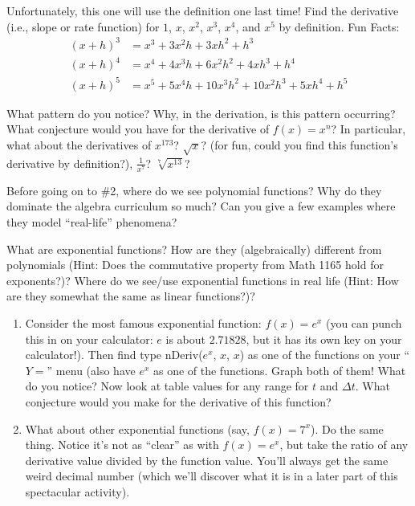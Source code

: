 \documentclass{ximera}
\begin{document}
\begin{exercise} 
Unfortunately, this one will use the definition one last time!  Find the derivative (i.e., slope or rate function) for $1$, $x$, $x^2$, $x^3$, $x^4$,     and $x^5$ by definition.  Fun Facts:   
\begin{align*} 
(x+h)^3 &= x^3 + 3x^2h + 3xh^2+h^3\\
(x+h)^4 &= x^4 + 4x^3h + 6x^2h^2 + 4xh^3 + h^4\\
(x+h)^5 &= x^5 + 5x^4h + 10x^3h^2 + 10x^2h^3+5xh^4+h^5
\end{align*}

What pattern do you notice?  Why, in the derivation, is this pattern occurring? What conjecture would you have for the derivative of  $f(x) = x^n$? In particular, what about the derivatives of  $x^{173}$?    $\sqrt{x}$? (for fun, could you find this function's derivative by definition?),  $\frac{1}{x^7}$?   $\sqrt[7]{x^{13}}$?

Before going on to \#2, where do we see polynomial functions?  Why do they dominate the algebra curriculum so much?  Can you give a few examples where they model ``real-life'' phenomena?
\end{exercise}
\begin{exercise} 
What are exponential functions?  How are they (algebraically) different from polynomials (Hint:  Does the commutative property from Math 1165 hold for exponents?)?  Where do we see/use exponential functions in real life (Hint:  How are they somewhat the same as linear functions?)?
\begin{enumerate}
\item Consider the most famous exponential function: $f(x) = e^x$   (you can punch this in on your calculator:  $e$ is about $2.71828$, but it has its own key on your calculator!).  Then find type nDeriv($e^x$, $x$, $x$) as one of the functions on your ``$Y=$'' menu (also have $e^x$  as one of the functions.  Graph both of them!  What do you notice?  Now look at table values for any range for $t$ and $\Delta t$.  What conjecture would you make for the derivative of this function?
\item  What about other exponential functions (say,  $f(x) = 7^x$).  Do the same thing.  Notice it's not as ``clear'' as with $f(x) = e^x$, but take the ratio of any derivative value divided by the function value.  You'll always get the same weird decimal number (which we'll discover what it is in a later part of this spectacular activity).
\end{enumerate}
\end{exercise}
\end{document}
